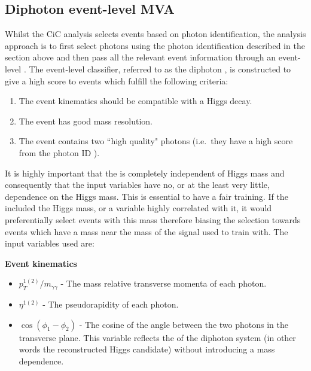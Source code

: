 \subsection{Diphoton event-level \acs{MVA}}
\label{sec:diphoton_bdt}

Whilst the CiC analysis selects events based on photon identification, the \MVA analysis approach is to first select photons using the photon identification \BDT described in the section above and then pass all the relevant event information through an event-level \BDT. The event-level classifier, referred to as the diphoton \BDT, is constructed to give a high score to events which fulfill the following criteria:

\begin{enumerate}
  \item The event kinematics should be compatible with a Higgs decay.
  \item The event has good mass resolution.
  \item The event contains two ``high quality" photons (i.e.~they have a high score from the photon ID \BDT).
\end{enumerate}

It is highly important that the \BDT is completely independent of Higgs mass and consequently that the input variables have no, or at the least very little, dependence on the Higgs mass. This is essential to have a fair training. If the \BDT included the Higgs mass, or a variable highly correlated with it, it would preferentially select events with this mass therefore biasing the selection towards events which have a mass near the mass of the signal used to train with. The input variables used are:

\noindent\textbf{Event kinematics}
\begin{itemize}
  \item $p_{T}^{1(2)}/m_{\gamma\gamma}$ - The mass relative transverse momenta of each photon.
  \item $\eta^{1(2)}$ - The pseudorapidity of each photon.
  \item $\cos(\phi_{1}-\phi_{2})$ - The cosine of the angle between the two photons in the transverse plane. This variable reflects the \pT of the diphoton system (in other words the reconstructed Higgs candidate) without introducing a mass dependence.
\end{itemize}

